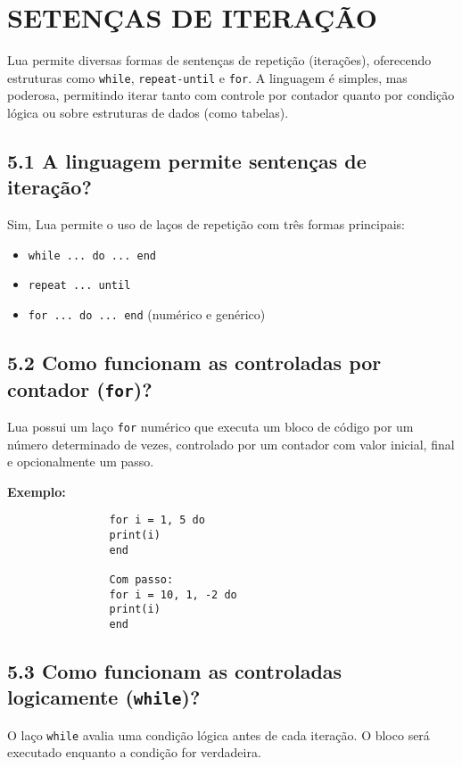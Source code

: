 \documentclass[12pt,a4paper]{article}
\begin{document}
			\section{SETENÇAS DE ITERAÇÃO}
			
			Lua permite diversas formas de sentenças de repetição (iterações), oferecendo estruturas como \verb|while|, \verb|repeat-until| e \verb|for|. A linguagem é simples, mas poderosa, permitindo iterar tanto com controle por contador quanto por condição lógica ou sobre estruturas de dados (como tabelas). 
			
			\subsection*{5.1 A linguagem permite sentenças de iteração?}
			
			Sim, Lua permite o uso de laços de repetição com três formas principais:
			
			\begin{itemize}
				\item \verb|while ... do ... end|
				\item \verb|repeat ... until|
				\item \verb|for ... do ... end| (numérico e genérico)
			\end{itemize}
			
			\subsection*{5.2 Como funcionam as controladas por contador (\texttt{for})?}
			
			Lua possui um laço \verb|for| numérico que executa um bloco de código por um número determinado de vezes, controlado por um contador com valor inicial, final e opcionalmente um passo.
			
			\textbf{Exemplo:}
			\begin{verbatim}
				for i = 1, 5 do
				print(i)
				end
				
				Com passo:
				for i = 10, 1, -2 do
				print(i)
				end
			\end{verbatim}
			
			\subsection*{5.3 Como funcionam as controladas logicamente (\texttt{while})?}
			
			O laço \verb|while| avalia uma condição lógica antes de cada iteração. O bloco será executado enquanto a condição for verdadeira.
			
\end{document}
